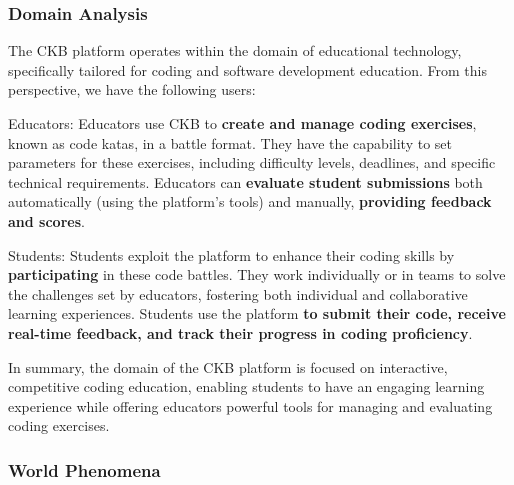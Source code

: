 \subsubsection{Domain Analysis}
The CKB platform operates within the domain of educational technology, specifically tailored for coding and software development education. From this perspective, we have the following users:

Educators:
Educators use CKB to \textbf{create and manage coding exercises}, known as code katas, in a battle format. They have the capability to set parameters for these exercises, including difficulty levels, deadlines, and specific technical requirements. Educators can \textbf{evaluate student submissions} both automatically (using the platform's tools) and manually, \textbf{providing feedback and scores}.

Students:
Students exploit the platform to enhance their coding skills by \textbf{participating} in these code battles. They work individually or in teams to solve the challenges set by educators, fostering both individual and collaborative learning experiences. Students use the platform \textbf{to submit their code, receive real-time feedback, and track their progress in coding proficiency}.

In summary, the domain of the CKB platform is focused on interactive, competitive coding education, enabling students to have an engaging learning experience while offering educators powerful tools for managing and evaluating coding exercises.

\subsubsection{World Phenomena}


